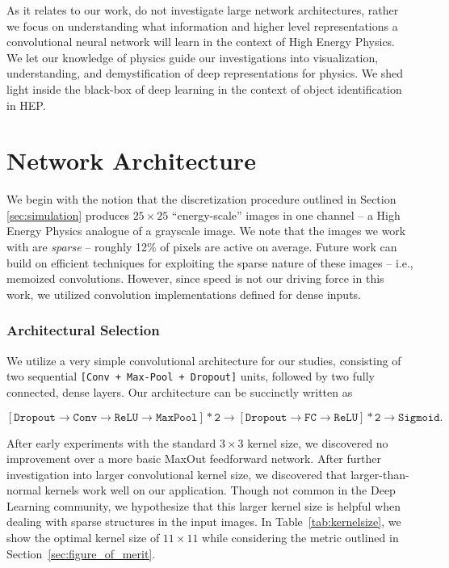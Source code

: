 \documentclass{article}
\begin{document}
As it relates to our work, do not investigate large network architectures, rather we focus on  understanding what information and higher level representations a convolutional neural network will learn in the context of High Energy Physics. We let our knowledge of physics guide our investigations into visualization, understanding, and demystification of deep representations for physics. We shed light inside the black-box of deep learning in the context of object identification in HEP.


\section{Network Architecture}


We begin with the notion that the discretization procedure outlined in Section \ref{sec:simulation} produces $25\times 25$ ``energy-scale'' images in one channel -- a High Energy Physics analogue of a grayscale image. We note that the images we work with are \emph{sparse} -- roughly 12\% of pixels are active on average. Future work can build on efficient techniques for exploiting the sparse nature of these images -- i.e., memoized convolutions. However, since speed is not our driving force in this work, we utilized convolution implementations defined for dense inputs.

\subsubsection{Architectural Selection} %
\label{ssub:architectural_selection}
We utilize a very simple convolutional architecture for our studies, consisting of two sequential \texttt{[Conv + Max-Pool + Dropout]} units, followed by two fully connected, dense layers. Our architecture can be succinctly written as 

\begin{equation}
  \mathtt{[Dropout \rightarrow Conv \rightarrow ReLU \rightarrow MaxPool] * 2 \rightarrow [Dropout \rightarrow FC \rightarrow ReLU] * 2 \rightarrow Sigmoid}.
\end{equation}

After early experiments with the standard $3\times 3$ kernel size, we discovered no improvement over a more basic MaxOut \cite{maxout:goodfellow} feedforward network. After further investigation into larger convolutional kernel size, we discovered that larger-than-normal kernels work well on our application. Though not common in the Deep Learning community, we hypothesize that this larger kernel size is helpful when dealing with sparse structures in the input images. In Table~\ref{tab:kernelsize}, we show the optimal kernel size of $11\times11$ while considering the metric outlined in Section~\ref{sec:figure_of_merit}.
\end{document}
